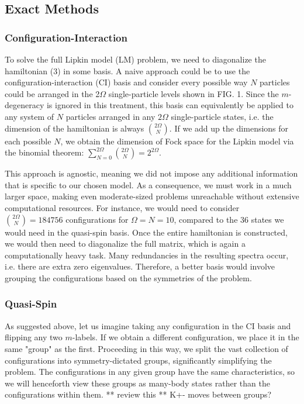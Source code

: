 \documentclass[prb,aps,twocolumn,showpacs,10pt]{revtex4-2}
\begin{document}
\subsection{Exact Methods}

\subsubsection{Configuration-Interaction}

To solve the full Lipkin model (LM) problem, we need to diagonalize the hamiltonian (3) in some basis. A naive approach could be to use the configuration-interaction (CI) basis and consider every possible way $N$ particles could be arranged in the 2$\Omega$ single-particle levels shown in FIG. 1. Since the $m$-degeneracy is ignored in this treatment, this basis can equivalently be applied to any system of $N$ particles arranged in any $2\Omega$ single-particle states, i.e. the dimension of the hamiltonian is always $2\Omega\choose N$. If we add up the dimensions for each possible $N$, we obtain the dimension of Fock space for the Lipkin model via the binomial theorem: $\sum_{N=0}^{2\Omega} {2\Omega\choose N} = 2^{2\Omega}$.

This approach is agnostic, meaning we did not impose any additional information that is specific to our chosen model. As a consequence, we must work in a much larger space, making even moderate-sized problems unreachable without extensive computational resources. For instance, we would need to consider ${2\Omega\choose N} = 184756$ configurations for $\Omega=N=10$, compared to the 36 states we would need in the quasi-spin basis. Once the entire hamiltonian is constructed, we would then need to diagonalize the full matrix, which is again a computationally heavy task. Many redundancies in the resulting spectra occur, i.e. there are extra zero eigenvalues. Therefore, a better basis would involve grouping the configurations based on the symmetries of the problem.

\subsubsection{Quasi-Spin}

As suggested above, let us imagine taking any configuration in the CI basis and flipping any two $m$-labels. If we obtain a different configuration, we place it in the same "group" as the first. Proceeding in this way, we split the vast collection of configurations into symmetry-dictated groups, significantly simplifying the problem. The configurations in any given group have the same characteristics, so we will henceforth view these groups as many-body states rather than the configurations within them. ** review this ** K+- moves between groups? 
\end{document}
